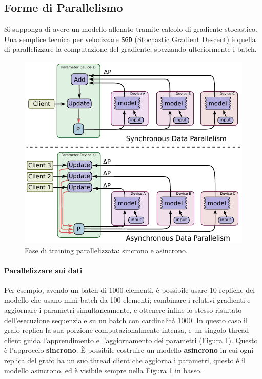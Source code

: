 \documentclass[DIV=calc, paper=a4, fontsize=11pt]{scrartcl}	 %
\begin{document}
\begin{multicols}{2}
		\section{Forme di Parallelismo}\label{sec:parallel}
			Si supponga di avere un modello allenato tramite calcolo di gradiente stocastico. Una semplice tecnica per velocizzare \texttt{SGD} (Stochastic Gradient Descent) è quella di parallelizzare la computazione del gradiente, spezzando ulteriormente i batch. 
			\begin{figure}[H]
				\centering
				\includegraphics[scale=.45]{img/sync-async.png}
				\caption{Fase di training parallelizzata: sincrono e asincrono.}
				\label{fig:syncr-asyncr}
			\end{figure}
			\paragraph*{Parallelizzare sui dati} Per esempio, avendo un batch di 1000 elementi, è possibile usare 10 repliche del modello che usano mini-batch da 100 elementi; combinare i relativi gradienti e aggiornare i parametri simultaneamente, e ottenere infine lo stesso risultato dell'esecuzione sequenziale su un batch con cardinalità 1000. In questo caso il grafo replica la sua porzione computazionalmente intensa, e un singolo thread client guida l'apprendimento e l'aggiornamento dei parametri (Figura \ref{fig:syncr-asyncr}). Questo è l'approccio \textbf{sincrono}.
			È possibile costruire un modello \textbf{asincrono} in cui ogni replica del grafo ha un suo thread client che aggiorna i parametri, questo è il modello asincrono, ed è visibile sempre nella Figura \ref{fig:syncr-asyncr} in basso.

\end{multicols}
\end{document}
